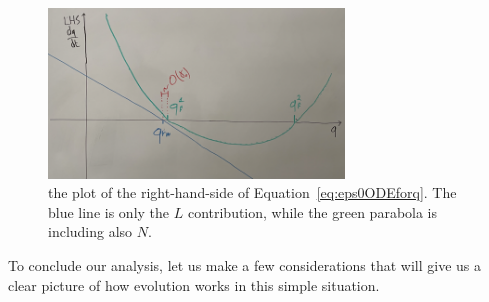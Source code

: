 \begin{figure}
    \centering
    \includegraphics[width=0.7\textwidth]{figures/epsilon0-stable-points.png}
    \caption{
      the plot of the right-hand-side of Equation~\eqref{eq:eps0ODEforq}.
      The blue line is only the \(L\) contribution, while the green parabola is including also \(N\).
    }
    \label{fig:epsilon0stablepoints}
\end{figure}
To conclude our analysis, let us make a few considerations that will give us a clear picture
of how evolution works in this simple situation.
